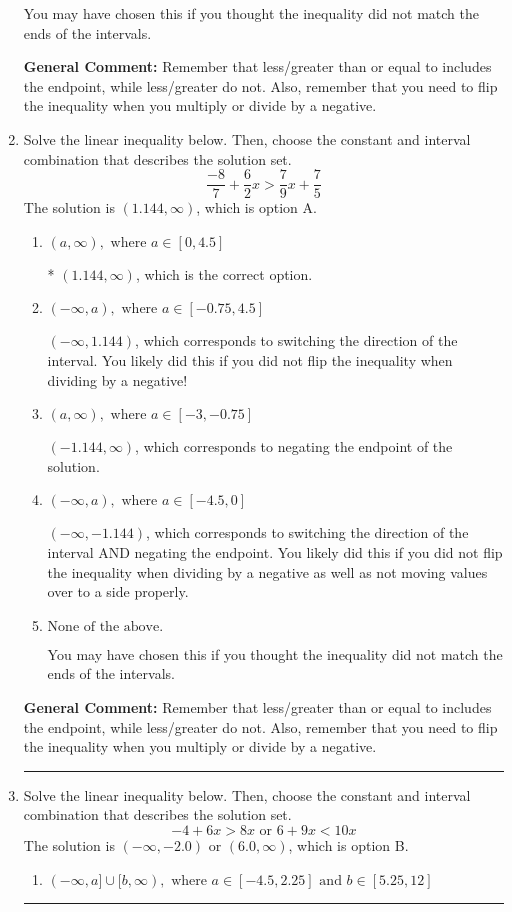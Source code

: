 \documentclass{extbook}[14pt]
\newcommand{\litem}[1]{\item #1

\rule{\textwidth}{0.4pt}}
\begin{document}
\begin{enumerate}
{\begin{enumerate}[label=\Alph*.]
You may have chosen this if you thought the inequality did not match the ends of the intervals.
\end{enumerate}

\textbf{General Comment:} Remember that less/greater than or equal to includes the endpoint, while less/greater do not. Also, remember that you need to flip the inequality when you multiply or divide by a negative.
}
\litem{
Solve the linear inequality below. Then, choose the constant and interval combination that describes the solution set.
\[ \frac{-8}{7} + \frac{6}{2} x > \frac{7}{9} x + \frac{7}{5} \]The solution is \( (1.144, \infty) \), which is option A.\begin{enumerate}[label=\Alph*.]
\item \( (a, \infty), \text{ where } a \in [0, 4.5] \)

* $(1.144, \infty)$, which is the correct option.
\item \( (-\infty, a), \text{ where } a \in [-0.75, 4.5] \)

 $(-\infty, 1.144)$, which corresponds to switching the direction of the interval. You likely did this if you did not flip the inequality when dividing by a negative!
\item \( (a, \infty), \text{ where } a \in [-3, -0.75] \)

 $(-1.144, \infty)$, which corresponds to negating the endpoint of the solution.
\item \( (-\infty, a), \text{ where } a \in [-4.5, 0] \)

 $(-\infty, -1.144)$, which corresponds to switching the direction of the interval AND negating the endpoint. You likely did this if you did not flip the inequality when dividing by a negative as well as not moving values over to a side properly.
\item \( \text{None of the above}. \)

You may have chosen this if you thought the inequality did not match the ends of the intervals.
\end{enumerate}

\textbf{General Comment:} Remember that less/greater than or equal to includes the endpoint, while less/greater do not. Also, remember that you need to flip the inequality when you multiply or divide by a negative.
}
\litem{
Solve the linear inequality below. Then, choose the constant and interval combination that describes the solution set.
\[ -4 + 6 x > 8 x \text{ or } 6 + 9 x < 10 x \]The solution is \( (-\infty, -2.0) \text{ or } (6.0, \infty) \), which is option B.\begin{enumerate}[label=\Alph*.]
\item \( (-\infty, a] \cup [b, \infty), \text{ where } a \in [-4.5, 2.25] \text{ and } b \in [5.25, 12] \)


\end{enumerate}}
\end{enumerate}
\end{document}
